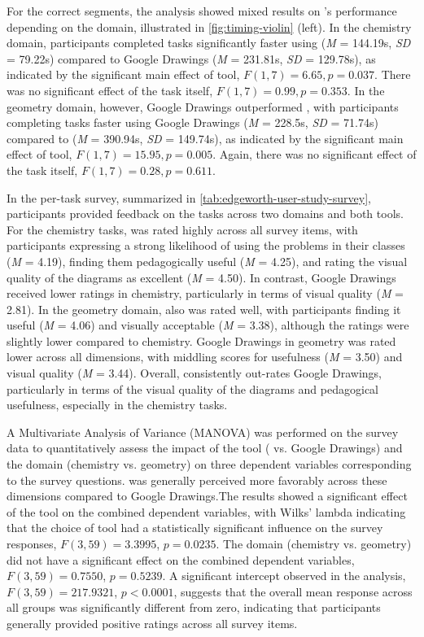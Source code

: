 For the correct segments, the analysis showed mixed results on \Penrose's performance depending on the domain, illustrated in \cref{fig:timing-violin} (left). In the chemistry domain, participants completed tasks significantly faster using \Penrose (\textit{M} = 144.19s, \textit{SD} = 79.22s) compared to Google Drawings (\textit{M} = 231.81s, \textit{SD} = 129.78s), as indicated by the significant main effect of tool, $F(1, 7) = 6.65, p = 0.037$. There was no significant effect of the task itself, $F(1, 7) = 0.99, p = 0.353$. In the geometry domain, however, Google Drawings outperformed \Penrose, with participants completing tasks faster using Google Drawings (\textit{M} = 228.5s, \textit{SD} = 71.74s) compared to \Penrose (\textit{M} = 390.94s, \textit{SD} = 149.74s), as indicated by the significant main effect of tool, $F(1, 7) = 15.95, p = 0.005$. Again, there was no significant effect of the task itself, $F(1, 7) = 0.28, p = 0.611$.


In the per-task survey, summarized in \cref{tab:edgeworth-user-study-survey}, participants provided feedback on the tasks across two domains and both tools. For the chemistry tasks, \Edgeworth was rated highly across all survey items, with participants expressing a strong likelihood of using the problems in their classes (\textit{M} = 4.19), finding them pedagogically useful (\textit{M} = 4.25), and rating the visual quality of the diagrams as excellent (\textit{M} = 4.50). In contrast, Google Drawings received lower ratings in chemistry, particularly in terms of visual quality (\textit{M} = 2.81). In the geometry domain, \Edgeworth also was rated well, with participants finding it useful (\textit{M} = 4.06) and visually acceptable (\textit{M} = 3.38), although the ratings were slightly lower compared to chemistry. Google Drawings in geometry was rated lower across all dimensions, with middling scores for usefulness (\textit{M} = 3.50) and visual quality (\textit{M} = 3.44). Overall, \Edgeworth consistently out-rates Google Drawings, particularly in terms of the visual quality of the diagrams and pedagogical usefulness, especially in the chemistry tasks.


A Multivariate Analysis of Variance (MANOVA) was performed on the survey data to quantitatively assess the impact of the tool (\Edgeworth{} vs. Google Drawings) and the domain (chemistry vs. geometry) on three dependent variables corresponding to the survey questions. \Edgeworth{} was generally perceived more favorably across these dimensions compared to Google Drawings.The results showed a significant effect of the tool on the combined dependent variables, with Wilks' lambda indicating that the choice of tool had a statistically significant influence on the survey responses, $F(3, 59) = 3.3995$, $p = 0.0235$. The domain (chemistry vs. geometry) did not have a significant effect on the combined dependent variables, $F(3, 59) = 0.7550$, $p = 0.5239$. A significant intercept observed in the analysis, $F(3, 59) = 217.9321$, $p < 0.0001$, suggests that the overall mean response across all groups was significantly different from zero, indicating that participants generally provided positive ratings across all survey items.


